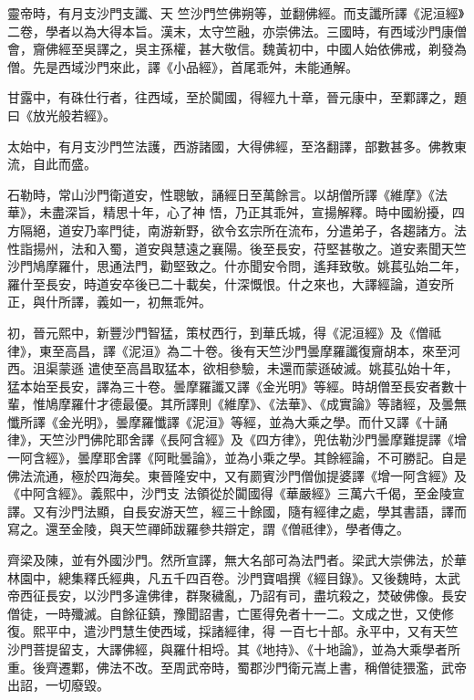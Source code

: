 \begin{pinyinscope}
 靈帝時，有月支沙門支讖、天
 竺沙門竺佛朔等，並翻佛經。而支讖所譯《泥洹經》二卷，學者以為大得本旨。漢末，太守竺融，亦崇佛法。三國時，有西域沙門康僧會，齎佛經至吳譯之，吳主孫權，甚大敬信。魏黃初中，中國人始依佛戒，剃發為僧。先是西域沙門來此，譯《小品經》，首尾乖舛，未能通解。



 甘露中，有硃仕行者，往西域，至於闐國，得經九十章，晉元康中，至鄴譯之，題曰《放光般若經》。



 太始中，有月支沙門竺法護，西游諸國，大得佛經，至洛翻譯，部數甚多。佛教東流，自此而盛。



 石勒時，常山沙門衛道安，性聰敏，誦經日至萬餘言。以胡僧所譯《維摩》《法華》，未盡深旨，精思十年，心了神
 悟，乃正其乖舛，宣揚解釋。時中國紛擾，四方隔絕，道安乃率門徒，南游新野，欲令玄宗所在流布，分遣弟子，各趨諸方。法性詣揚州，法和入蜀，道安與慧遠之襄陽。後至長安，苻堅甚敬之。道安素聞天竺沙門鳩摩羅什，思通法門，勸堅致之。什亦聞安令問，遙拜致敬。姚萇弘始二年，羅什至長安，時道安卒後已二十載矣，什深慨恨。什之來也，大譯經論，道安所正，與什所譯，義如一，初無乖舛。



 初，晉元熙中，新豐沙門智猛，策杖西行，到華氏城，得《泥洹經》及《僧祗律》，東至高昌，譯《泥洹》為二十卷。後有天竺沙門曇摩羅讖復齎胡本，來至河西。沮渠蒙遜
 遣使至高昌取猛本，欲相參驗，未還而蒙遜破滅。姚萇弘始十年，猛本始至長安，譯為三十卷。曇摩羅讖又譯《金光明》等經。時胡僧至長安者數十輩，惟鳩摩羅什才德最優。其所譯則《維摩》、《法華》、《成實論》等諸經，及曇無懺所譯《金光明》，曇摩羅懺譯《泥洹》等經，並為大乘之學。而什又譯《十誦律》，天竺沙門佛陀耶舍譯《長阿含經》及《四方律》，兜佉勒沙門曇摩難提譯《增一阿含經》，曇摩耶舍譯《阿毗曇論》，並為小乘之學。其餘經論，不可勝記。自是佛法流通，極於四海矣。東晉隆安中，又有罽賓沙門僧伽提婆譯《增一阿含經》及《中阿含經》。義熙中，沙門支
 法領從於闐國得《華嚴經》三萬六千偈，至金陵宣譯。又有沙門法顯，自長安游天竺，經三十餘國，隨有經律之處，學其書語，譯而寫之。還至金陵，與天竺禪師跋羅參共辯定，謂《僧祗律》，學者傳之。



 齊梁及陳，並有外國沙門。然所宣譯，無大名部可為法門者。梁武大崇佛法，於華林園中，總集釋氏經典，凡五千四百卷。沙門寶唱撰《經目錄》。又後魏時，太武帝西征長安，以沙門多違佛律，群聚穢亂，乃詔有司，盡坑殺之，焚破佛像。長安僧徒，一時殲滅。自餘征鎮，豫聞詔書，亡匿得免者十一二。文成之世，又使修復。熙平中，遣沙門慧生使西域，採諸經律，得
 一百七十部。永平中，又有天竺沙門菩提留支，大譯佛經，與羅什相埒。其《地持》、《十地論》，並為大乘學者所重。後齊遷鄴，佛法不改。至周武帝時，蜀郡沙門衛元嵩上書，稱僧徒猥濫，武帝出詔，一切廢毀。




\end{pinyinscope}
